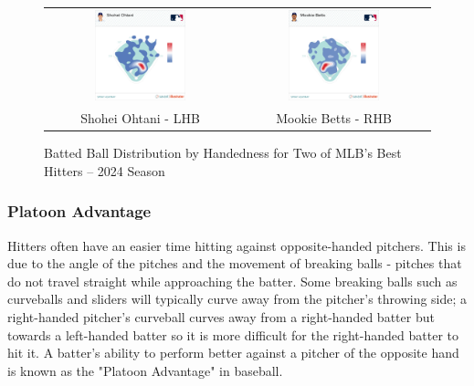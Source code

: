 \documentclass{article}
\begin{document}
\begin{figure}[h]
    \centering
    \begin{tabular}{cc}  
        \includegraphics[width=0.5\textwidth]{images/OhtaniHeat.jpg} & 
        \includegraphics[width=0.5\textwidth]{images/BettsHeat.jpg} \\
        Shohei Ohtani - LHB \cite{mlbsavant2023ohtani} & Mookie Betts - RHB \cite{mlbsavant2023betts}
    \end{tabular}
    \caption{Batted Ball Distribution by Handedness for Two of MLB's Best Hitters – 2024 Season}
    \label{fig:heatmaps}
\end{figure}
\vspace{1.5cm}

\newpage
 



\subsubsection{Platoon Advantage} \label{sec:platoon}
Hitters often have an easier time hitting against opposite-handed pitchers. This is due to the angle of the pitches and the movement of breaking balls - pitches that do not travel straight while approaching the batter. Some breaking balls such as curveballs and sliders will typically curve away from the pitcher's throwing side; a right-handed pitcher's curveball curves away from a right-handed batter but towards a left-handed batter so it is more difficult for the right-handed batter to hit it. A batter's ability to perform better against a pitcher of the opposite hand is known as the "Platoon Advantage" in baseball. 
\end{document}
